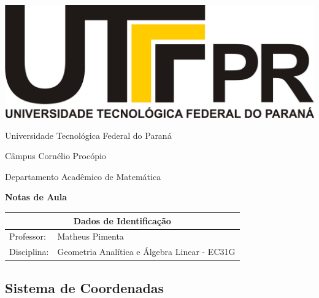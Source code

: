 \documentclass[oneside,a4paper,12pt]{article}
\newcommand{\universidade}{Universidade Tecnológica Federal do Paraná}
\newcommand{\centro}{Câmpus Cornélio Procópio}
\newcommand{\departamento}{Departamento Acadêmico de Matemática}
\newcommand{\curso}{Turma Especial}
\newcommand{\professores}{Matheus Pimenta}
\newcommand{\disciplina}{Geometria Analítica e Álgebra Linear - EC31G}
\begin{document}
	\begin{center}
		\includegraphics[width=\linewidth/8]{logo.jpg}%
	 	\vspace{2pt} 	
		
		\universidade
		\par
		\centro
		\par
		\departamento
		\par
		\par
		\vspace{12pt}
		\LARGE \textbf{Notas de Aula}
		
	\end{center}
	
	\vspace{12pt}
	
	\begin{tabular}{ |l|p{12cm}| }
		
		\hline
		\multicolumn{2}{|c|}{\textbf{Dados de Identificação}} \\
		\hline
		Professor:         &    \professores           \\
		\hline
		Disciplina:        &    \disciplina          \\
		\hline
		
	\end{tabular}
	\vspace{6pt}
	
	
	\begin{snugshade}
		\section{Sistema de Coordenadas}
	\end{snugshade}
\end{document}
